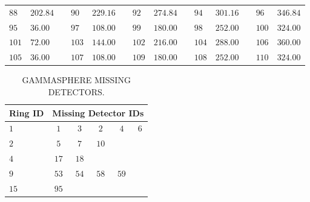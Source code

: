 \begin{table}
\begin{center}
\begin{tabular}{llcllcllcllcll}
 $88$&$202.84$& & $90$&$229.16$& & $92$&$274.84$& & $94$&$301.16$& & $96$&$346.84$\\
 $95$& $36.00$& & $97$&$108.00$& & $99$&$180.00$& & $98$&$252.00$& &$100$&$324.00$\\
$101$& $72.00$& &$103$&$144.00$& &$102$&$216.00$& &$104$&$288.00$& &$106$&$360.00$\\
$105$& $36.00$& &$107$&$108.00$& &$109$&$180.00$& &$108$&$252.00$& &$110$&$324.00$\\
\bottomrule
\end{tabular}
\end{center}
\end{table}

\begin{table}
\caption{GAMMASPHERE MISSING DETECTORS.\label{tbl:app1-gs-missing-det}}
\begin{center}
\begin{tabular}{lccccc}
\toprule
Ring ID & \multicolumn{5}{c}{Missing Detector IDs}\\ 
\midrule
$1$&$1$&$3$&$2$&$4$&$6$\\
$2$&$5$&$7$&$10$&&\\
$4$&$17$&$18$&&&\\
$9$&$53$&$54$&$58$&$59$&\\
$15$&$95$&&&&\\
\bottomrule
\end{tabular}
\end{center}
\end{table}

